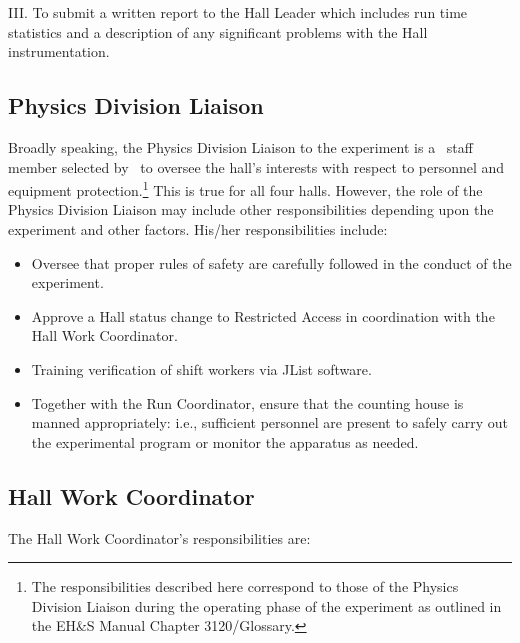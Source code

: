 \documentclass[10pt]{article}
\begin{document}
\noindent III. To submit a written report to the Hall Leader which includes
run time statistics and a description of any significant problems with the 
Hall instrumentation.


\subsection{Physics Division Liaison}

Broadly speaking, the Physics Division Liaison to the experiment 
is a \HALL\ staff member selected by \HALLLEADER\
to oversee the hall's interests with respect to personnel and equipment 
protection.\footnote{The responsibilities described here correspond 
to those of the Physics Division Liaison during
the operating phase of the experiment as outlined in the
EH\&S Manual Chapter 3120/Glossary.} 
This is true for all four halls. However, the role of
the Physics Division Liaison may include other responsibilities
depending upon the experiment and other factors. His/her responsibilities
include:
\begin{itemize}
\item Oversee that proper rules of safety are carefully followed in the 
conduct of the experiment.
\item Approve a Hall status change to Restricted Access in coordination
with the Hall Work Coordinator.
\item Training verification of shift workers via JList software.
\item Together with the Run Coordinator, 
ensure that the counting house is manned appropriately: i.e.,
sufficient personnel are present to safely carry out the experimental 
program or monitor the apparatus as needed.
\end{itemize}  

\subsection{Hall Work Coordinator}

The Hall Work Coordinator's responsibilities are: 
\end{document}
